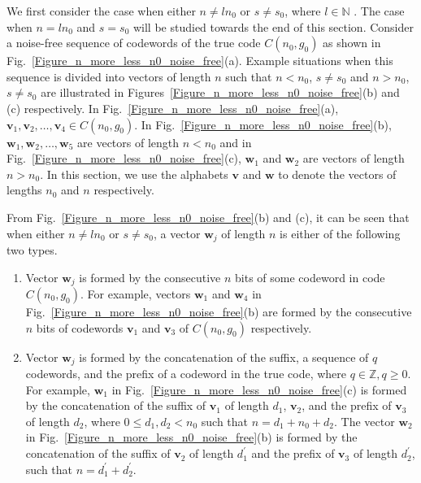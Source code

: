 \documentclass[10pt,journal]{IEEEtran}
\def \Fig {Fig.}
\begin{document}
We first consider the case when either $n \neq ln_0$ or $s \neq s_0$, where $l \in \mathbb{N}$ .
The case when $n = ln_0$ and $s = s_0$ will be studied towards the end of this section.
% 
Consider a noise-free sequence of codewords of the true code $C(n_0,g_0)$ as shown in \Fig~\ref{Figure_n_more_less_n0_noise_free}(a).
Example situations when this sequence is divided into vectors of length $n$ such that $n < n_0$, $s \neq s_0$ and $n > n_0$, $s \neq s_0$
are illustrated in Figures~\ref{Figure_n_more_less_n0_noise_free}(b) and (c) respectively.
% 
In \Fig~\ref{Figure_n_more_less_n0_noise_free}(a), $\mathbf{v}_1, \mathbf{v}_2, \ldots, \mathbf{v}_4 \in C(n_0,g_0)$.
In \Fig~\ref{Figure_n_more_less_n0_noise_free}(b), $\mathbf{w}_1, \mathbf{w}_2, \ldots, \mathbf{w}_5$
are vectors of length $n < n_0$ and 
in \Fig~\ref{Figure_n_more_less_n0_noise_free}(c), $\mathbf{w}_1$ and $\mathbf{w}_2$
are vectors of length $n > n_0$.
In this section, we use the alphabets $\mathbf{v}$ and $\mathbf{w}$ to denote the vectors of lengths $n_0$ 
and $n$ respectively.


From \Fig~\ref{Figure_n_more_less_n0_noise_free}(b) and (c),
it can be seen that when either $n \neq ln_0$ or $s \neq s_0$, a vector $\mathbf{w}_j$ of length $n$ is either of the following two types.
% 
\begin{enumerate}
%  
\item Vector $\mathbf{w}_j$ is formed by the consecutive $n$ bits of some codeword in code $C(n_0,g_0)$.
For example, vectors $\mathbf{w}_1$ and $\mathbf{w}_4$ in \Fig~\ref{Figure_n_more_less_n0_noise_free}(b)
are formed by the consecutive $n$ bits of codewords $\mathbf{v}_1$ and $\mathbf{v}_3$ of $C(n_0,g_0)$ respectively.
% 
\item Vector $\mathbf{w}_j$ is formed by the concatenation of the suffix, a sequence of $q$ codewords, and the prefix of
a codeword in the true code, where $q \in \mathbb{Z}, q \geq 0$.
For example, $\mathbf{w}_1$ in \Fig~\ref{Figure_n_more_less_n0_noise_free}(c) is formed by the concatenation of
the suffix of $\mathbf{v}_1$ of length $d_1$, $\mathbf{v}_2$, and the prefix of $\mathbf{v}_3$ of length $d_2$, where $0 \leq d_1,d_2 < n_0$
such that $n = d_1+n_0+d_2$.
The vector $\mathbf{w}_2$ in \Fig~\ref{Figure_n_more_less_n0_noise_free}(b) is formed by the concatenation of
the suffix of $\mathbf{v}_2$ of length $d_1^{\prime}$ and the prefix of $\mathbf{v}_3$ of length $d_2^{\prime}$, 
such that $n=d_1^{\prime}+d_2^{\prime}$.
% 
\end{enumerate}
% 
\end{document}
